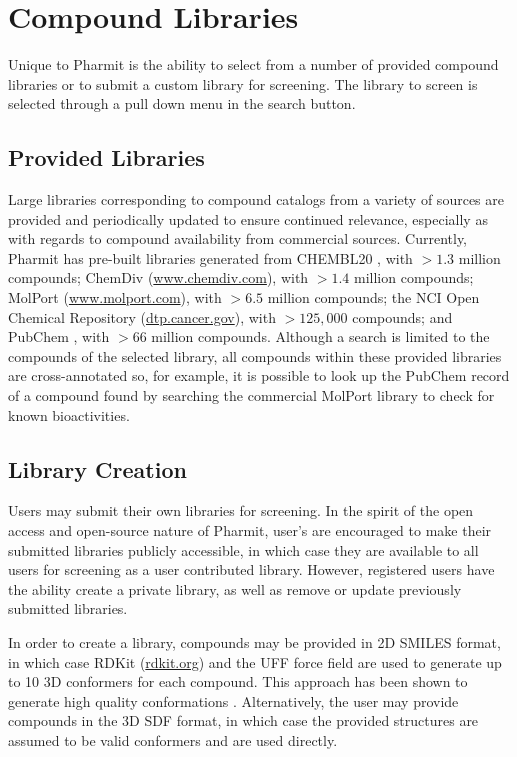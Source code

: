 \section{Compound Libraries}

Unique to Pharmit is the ability to select from a number of provided compound libraries or to submit a custom library for screening.  The library to screen is selected through a pull down menu in the search button.  

\subsection{Provided Libraries}

Large libraries corresponding to compound catalogs from a variety of sources are provided and periodically updated to ensure continued relevance, especially as with regards to compound availability from commercial sources.  Currently, Pharmit has pre-built libraries generated from CHEMBL20 \cite{Gaulton_2011}, with $>1.3$ million compounds; ChemDiv (\url{www.chemdiv.com}), with $>1.4$ million compounds; MolPort (\url{www.molport.com}), with $>6.5$ million compounds; the NCI Open Chemical Repository (\url{dtp.cancer.gov}), with $>125,000$ compounds; and PubChem \cite{Kim_2015}, with $>66$ million compounds. 
 Although a search is limited to the compounds of the selected library, all compounds within these provided libraries are cross-annotated so, for example, it is possible to look up the PubChem record of a compound found by searching the commercial MolPort library to check for known bioactivities.


\subsection{Library Creation}

Users may submit their own libraries for screening.  In the spirit of the open access and open-source nature of Pharmit, user's are encouraged to make their submitted libraries publicly accessible, in which case they are available to all users for screening as a user contributed library.  However, registered users have the ability create a private library, as well as remove or update previously submitted libraries. 

In order to create a library, compounds may be provided in 2D SMILES format, in which case RDKit (\url{rdkit.org}) and the UFF force field \cite{Rappe_1992} are used to generate up to 10 3D conformers for each compound.  This approach has been shown to generate high quality conformations \cite{Ebejer_2012}.  Alternatively, the user may provide compounds in the 3D SDF format, in which case the provided structures are assumed to be valid conformers and are used directly.
